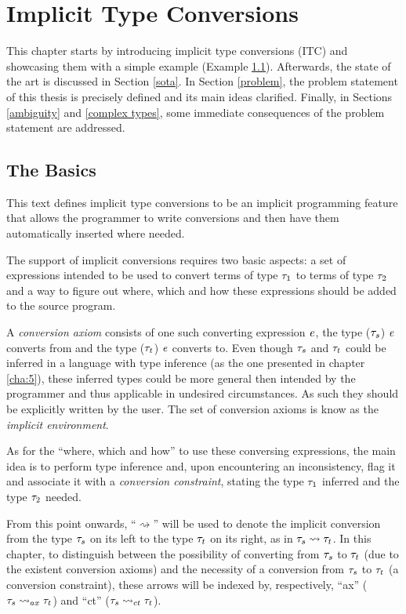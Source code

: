 \chapter{Implicit Type Conversions}
\label{cha:4}

This chapter starts by introducing implicit type conversions (ITC) and showcasing them with a simple example (Example \ref{itc4}). Afterwards, the state of the art is discussed in Section \ref{sota}. In Section \ref{problem}, the problem statement of this thesis is precisely defined and its main ideas clarified. Finally, in Sections \ref{ambiguity} and \ref{complex types}, some immediate consequences of the problem statement are addressed.

\section{The Basics}
\label{itc4}
This text defines implicit type conversions to be an implicit programming feature that allows the programmer to write conversions and then have them automatically inserted where needed.

The support of implicit conversions requires two basic aspects: a set of expressions intended to be used to convert terms of type $\mathit{\tau}_1$ to terms of type $\mathit{\tau}_2$ and a way to figure out where, which and how these expressions should be added to the source program.

A \textit{conversion axiom} consists of one such converting expression $\mathit{e}$, the type ($\mathit{\tau}_s$) $\mathit{e}$ converts from and the type ($\mathit{\tau}_t$) $\mathit{e}$ converts to. Even though $\mathit{\tau}_s$ and $\mathit{\tau}_t$ could be inferred in a language with type inference (as the one presented in chapter \ref{cha:5}), these inferred types could be more general then intended by the programmer and thus applicable in undesired circumstances. As such they should be explicitly written by the user. The set of conversion axioms is know as the \textit{implicit environment}.

As for the ``where, which and how'' to use these conversing expressions, the main idea is to perform type inference and, upon encountering an inconsistency, flag it and associate it with a \textit{conversion constraint}, stating the type $\mathit{\tau}_1$ inferred and the type $\mathit{\tau}_2$ needed.

From this point onwards, ``$\rightsquigarrow$'' will be used to denote the implicit conversion from the type $\mathit{\tau}_s$ on its left to the type $\mathit{\tau}_t$ on its right, as in  $\mathit{\tau}_s \rightsquigarrow \mathit{\tau}_t$. In this chapter, to distinguish between the possibility of converting from $\mathit{\tau}_s$ to $\mathit{\tau}_t$ (due to the existent conversion axioms) and the necessity of a conversion from $\mathit{\tau}_s$ to $\mathit{\tau}_t$ (a conversion constraint), these arrows will be indexed by, respectively, ``ax'' ($\mathit{\tau}_s\rightsquigarrow_{ax}\mathit{\tau}_t$) and ``ct'' ($\mathit{\tau}_s\rightsquigarrow_{ct}\mathit{\tau}_t$).

